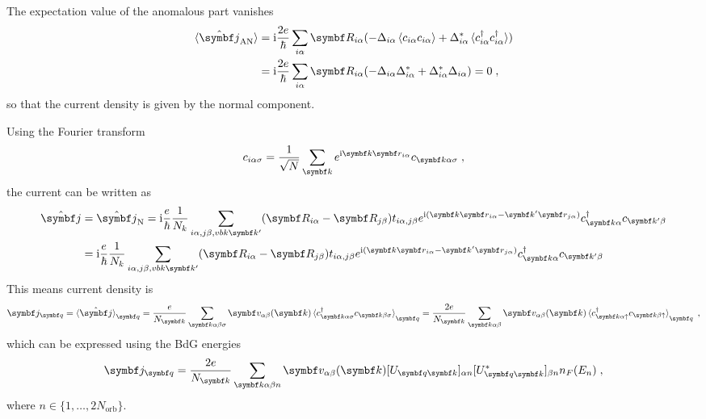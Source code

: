 \documentclass[../notes.tex]{subfiles}
\begin{document}
The expectation value of the anomalous part vanishes
\begin{align}
	\braket{\ope{\vb{j}}_{\mathrm{AN}}} &= \iu \frac{2 e}{\hbar} \sum_{i\alpha} \vb{R}_{i \alpha} (-\Delta_{i \alpha} \braket{c_{i \alpha} c_{i \alpha}} + \Delta_{i \alpha}^* \braket{c_{i \alpha}^{\dagger} c_{i \alpha}^{\dagger}}) \\
	&= \iu \frac{2 e}{\hbar} \sum_{i\alpha} \vb{R}_{i \alpha} (-\Delta_{i \alpha} \Delta_{i \alpha}^* + \Delta_{i \alpha}^* \Delta_{i \alpha}) = 0 \;,
\end{align}
so that the current density is given by the normal component.

Using the Fourier transform
\begin{equation}
	c_{i \alpha \sigma} = \frac{1}{\sqrt{N}} \sum_{\vb{k}} e^{\iu \vb{k} \vb{r}_{i \alpha}} c_{\vb{k} \alpha \sigma} \;,
\end{equation}
the current can be written as
\begin{align}
	\ope{\vb{j}} &= \ope{\vb{j}}_{\mathrm{N}} = \iu \frac{e}{\hbar} \frac{1}{N_k} \sum_{i\alpha, j\beta, vb{k} \vb{k}^{\prime}} (\vb{R}_{i \alpha} - \vb{R}_{j \beta}) t_{i \alpha, j \beta} e^{\iu (\vb{k} \vb{r}_{i \alpha} - \vb{k}^{\prime} \vb{r}_{j \alpha})} c_{\vb{k} \alpha}^{\dagger} c_{\vb{k}^{\prime} \beta} \\
	&= \iu \frac{e}{\hbar} \frac{1}{N_k} \sum_{i\alpha, j\beta, vb{k} \vb{k}^{\prime}} (\vb{R}_{i \alpha} - \vb{R}_{j \beta}) t_{i \alpha, j \beta} e^{\iu (\vb{k} \vb{r}_{i \alpha} - \vb{k}^{\prime} \vb{r}_{j \alpha})} c_{\vb{k} \alpha}^{\dagger} c_{\vb{k}^{\prime} \beta} \\
\end{align}
This means current density is
\begin{align}
	\vb{j}_{\vb{q}} = \braket{\ope{\vb{j}}}_{\vb{q}} = \frac{e}{N_{\vb{k}}} \sum_{\vb{k} \alpha \beta \sigma} \vb{v}_{\alpha \beta} (\vb{k}) \braket{c_{\vb{k} \alpha \sigma}^{\dagger} c_{\vb{k} \beta \sigma}}_{\vb{q}} = \frac{2 e}{N_{\vb{k}}} \sum_{\vb{k} \alpha \beta} \vb{v}_{\alpha \beta} (\vb{k}) \braket{c_{\vb{k} \alpha \uparrow}^{\dagger} c_{\vb{k} \beta \uparrow}}_{\vb{q}} \;,
\end{align}
which can be expressed using the BdG energies
\begin{align}
	\vb{j}_{\vb{q}} = \frac{2 e}{N_{\vb{k}}} \sum_{\vb{k} \alpha \beta n} \vb{v}_{\alpha \beta} (\vb{k}) [U_{\vb{q} \vb{k}}]_{\alpha n} [U_{\vb{q} \vb{k}}^*]_{\beta n} n_F (E_n) \;,
\end{align}
where \(n \in \{1, \ldots, 2 N_{\mathrm{orb}}\}\).
\end{document}
